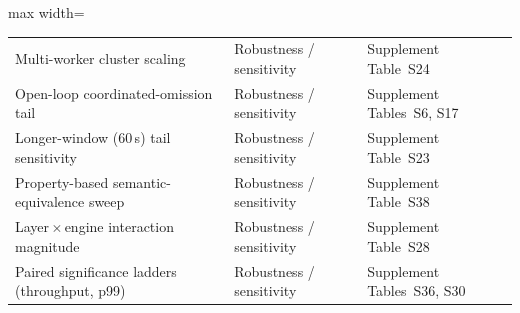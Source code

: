\begin{table}[htbp]
\begin{adjustbox}{max width=\textwidth}
\begin{tabular}{@{}l l l@{}}
    Multi-worker cluster scaling                         & Robustness / sensitivity & Supplement Table~S24 \\
    Open-loop coordinated-omission tail                  & Robustness / sensitivity & Supplement Tables~S6, S17 \\
    Longer-window (60\,s) tail sensitivity               & Robustness / sensitivity & Supplement Table~S23 \\
    Property-based semantic-equivalence sweep            & Robustness / sensitivity & Supplement Table~S38 \\
    Layer\,$\times$\,engine interaction magnitude        & Robustness / sensitivity & Supplement Table~S28 \\
    Paired significance ladders (throughput, p99)        & Robustness / sensitivity & Supplement Tables~S36, S30 \\
    \bottomrule
  \end{tabular}
  \end{adjustbox}
\end{table}
